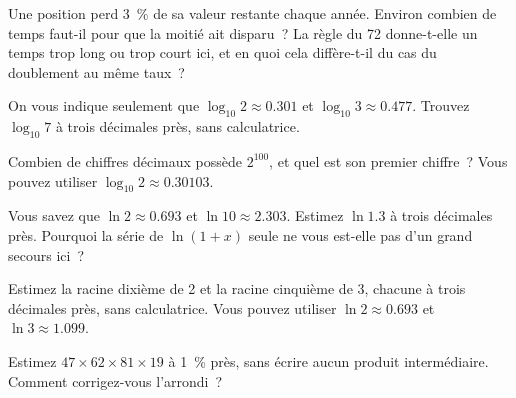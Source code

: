 \begin{question}\label{iq:iv1:mental-technique:31}
Une position perd 3~\% de sa valeur restante chaque année. Environ combien de temps faut-il pour que la moitié ait disparu~? La règle du 72 donne-t-elle un temps trop long ou trop court ici, et en quoi cela diffère-t-il du cas du doublement au même taux~?
\end{question}

\begin{question}\label{iq:iv1:mental-technique:32}
On vous indique seulement que $\log_{10} 2 \approx 0.301$ et $\log_{10} 3 \approx 0.477$. Trouvez $\log_{10} 7$ à trois décimales près, sans calculatrice.
\end{question}

\begin{question}\label{iq:iv1:mental-technique:33}
Combien de chiffres décimaux possède $2^{100}$, et quel est son premier chiffre~? Vous pouvez utiliser $\log_{10} 2 \approx 0.30103$.
\end{question}

\begin{question}\label{iq:iv1:mental-technique:34}
Vous savez que $\ln 2 \approx 0.693$ et $\ln 10 \approx 2.303$. Estimez $\ln 1.3$ à trois décimales près. Pourquoi la série de $\ln(1 + x)$ seule ne vous est-elle pas d'un grand secours ici~?
\end{question}

\begin{question}\label{iq:iv1:mental-technique:35}
Estimez la racine dixième de 2 et la racine cinquième de 3, chacune à trois décimales près, sans calculatrice. Vous pouvez utiliser $\ln 2 \approx 0.693$ et $\ln 3 \approx 1.099$.
\end{question}

\begin{question}\label{iq:iv1:mental-technique:36}
Estimez $47 \times 62 \times 81 \times 19$ à 1~\% près, sans écrire aucun produit intermédiaire. Comment corrigez-vous l'arrondi~?
\end{question}

